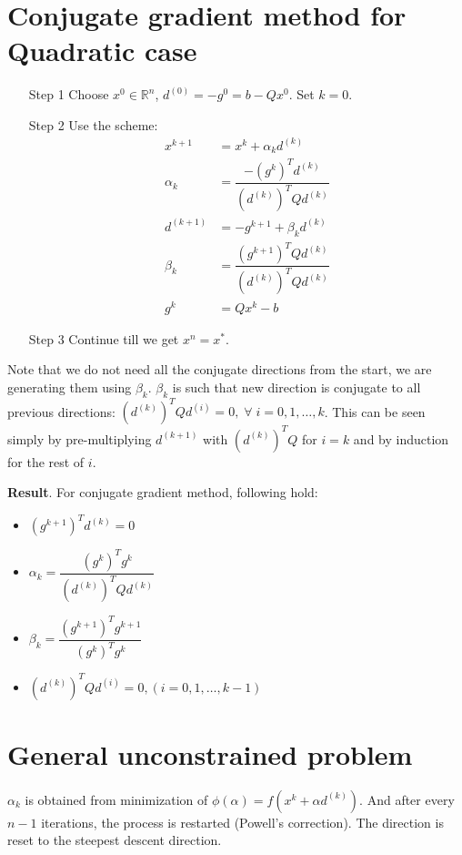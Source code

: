 \documentclass[11pt]{article}
\begin{document}
\section*{Conjugate gradient method for Quadratic case}
\begin{enumerate}
    \item[Step 1] Choose $x^0\in\mathbb{R}^n$, $d^{(0)}=-g^0=b-Qx^0$. Set $k=0$.
    \item[Step 2] Use the scheme:
        \begin{align*}
            x^{k+1}&=x^k+\alpha_kd^{(k)}\\
            \alpha_k&=\dfrac{-(g^k)^Td^{(k)}}{(d^{(k)})^TQd^{(k)}}\\
            d^{(k+1)}&=-g^{k+1}+\beta_kd^{(k)}\\
            \beta_k&=\dfrac{(g^{k+1})^TQd^{(k)}}{(d^{(k)})^TQd^{(k)}}\\
            g^k&=Qx^k-b
        \end{align*}
    \item[Step 3] Continue till we get $x^n=x^*$.
\end{enumerate}
Note that we do not need all the conjugate directions from the start, we are generating
them using $\beta_k$. $\beta_k$ is such that new direction is conjugate to all 
previous directions: $(d^{(k)})^TQd^{(i)}=0,\;\forall\;i=0,1,\dotsc,k$. This can
be seen simply by pre-multiplying $d^{(k+1)}$ with $(d^{(k)})^TQ$ for $i=k$ and
by induction for the rest of $i$.

\vskip0.5cm\noindent\textbf{Result}. For conjugate gradient method, following hold:
\begin{itemize}
    \item $(g^{k+1})^Td^{(k)}=0$\\
    \item $\alpha_k=\dfrac{(g^k)^Tg^k}{(d^{(k)})^TQd^{(k)}}$\\
    \item $\beta_k=\dfrac{(g^{k+1})^Tg^{k+1}}{(g^k)^Tg^k}$\\
    \item $(d^{(k)})^TQd^{(i)}=0, (i=0,1,\dotsc,k-1)$\\
\end{itemize}
%
%
\section*{General unconstrained problem}
$\alpha_k$ is obtained from minimization of $\phi(\alpha)=f(x^k+\alpha d^{(k)})$.
And after every $n-1$ iterations, the process is restarted (Powell's correction).
The direction is reset to the steepest descent direction.
\end{document}
